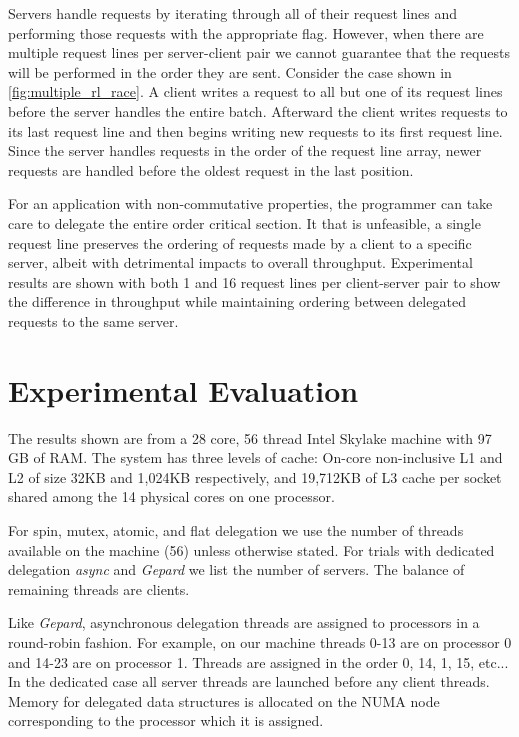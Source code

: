 \documentclass{uicthesi}
\begin{document}
Servers handle requests by iterating through all of their request lines and performing those requests with the appropriate flag. However, when there are multiple request lines per server-client pair we cannot guarantee that the requests will be performed in the order they are sent. Consider the case shown in \ref{fig:multiple_rl_race}.  A client writes a request to all but one of its request lines before the server handles the entire batch. Afterward the client writes requests to its last request line and then begins writing new requests to its first request line. Since the server handles requests in the order of the request line array, newer requests are handled before the oldest request in the last position. 

For an application with non-commutative properties, the programmer can take care to delegate the entire order critical section. It that is unfeasible, a single request line preserves the ordering of requests made by a client to a specific server, albeit with detrimental impacts to overall throughput. Experimental results are shown with both 1 and 16 request lines per client-server pair to show the difference in throughput while maintaining ordering between delegated requests to the same server. 

\chapter{Experimental Evaluation} \label{eval}
The results shown are from a 28 core, 56 thread Intel Skylake machine with 97 GB of RAM. The system has three levels of cache: On-core non-inclusive L1 and L2 of size 32KB and 1,024KB respectively, and 19,712KB of L3 cache per socket shared among the 14 physical cores on one processor. 

For spin, mutex, atomic, and flat delegation we use the number of threads available on the machine (56) unless otherwise stated. For trials with dedicated delegation \textit{async} and \textit{Gepard} we list the number of servers. The balance of remaining threads are clients.  

Like \textit{Gepard}, asynchronous delegation threads are assigned to processors in a round-robin fashion. For example, on our machine threads 0-13 are on processor 0 and 14-23 are on processor 1. Threads are assigned in the order 0, 14, 1, 15, etc... In the dedicated case all server threads are launched before any client threads. Memory for delegated data structures is allocated on the NUMA node corresponding to the processor which it is assigned. 
\end{document}

